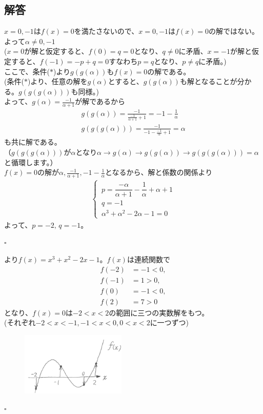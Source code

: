 \subsection*{解答}
\noindent [1]\quad $x = 0,-1$は$f(x)=0$を満たさないので、$x = 0,-1$は$f(x)=0$の解ではない。
よって$\alpha \neq 0,-1$\\
($x = 0$が解と仮定すると、$f(0) = q = 0$となり、$q \neq 0$に矛盾、$x = -1$が解と仮定すると、$f(-1) = -p + q = 0$すなわち$p=q$となり、$p \neq q$に矛盾。)\\
ここで、条件($\ast$)より$g(g(\alpha))$も$f(x) = 0$の解である。\\
(条件($\ast$)より、任意の解を$g(\alpha)$とすると、$g(g(\alpha))$も解となることが分かる。$g(g(g(\alpha)))$も同様。)\\
よって、$g(\alpha) = \frac{-1}{\alpha + 1}$が解であるから
\begin{align*}
 g(g(\alpha)) = \frac{-1}{\frac{-1}{\alpha + 1}+1} = - 1 - \frac{1}{\alpha}\\
 g(g(g(\alpha))) = \frac{-1}{-1-\frac{-1}{\alpha}+1} = \alpha
\end{align*}
も共に解である。\\
（$g(g(g(\alpha)))$が$\alpha$となり$\alpha \rightarrow g(\alpha) \rightarrow g(g(\alpha)) \rightarrow g(g(g(\alpha))) = \alpha$と循環します。）\\
$f(x) = 0$の解が$\alpha,\frac{-1}{\alpha + 1},-1-\frac{1}{\alpha}$となるから、解と係数の関係より
\begin{align*}
  \begin{cases}
  \, p = \dfrac{-\alpha}{\alpha + 1}-\dfrac{1}{\alpha}+\alpha +1\\
  \, q = -1\\
  \, \alpha^3 + \alpha^2 -2\alpha -1 = 0
  \end{cases}
\end{align*}
よって、$p = -2,\,q=-1$。
\begin{flushright}
  $\square$
\end{flushright}

\noindent [2]\quad {[1]}より$f(x) = x^3 + x^2 -2x -1$。$f(x)$は連続関数で
\begin{align*}
  f(-2) &= -1 < 0,\\
  f(-1) &= 1 > 0,\\
  f(0) &= -1 < 0,\\
  f(2) &= 7 > 0
\end{align*}
となり、$f(x) = 0$は$-2<x<2$の範囲に三つの実数解をもつ。\\
(それぞれ$-2<x<-1,-1<x<0,0<x<2$に一つずつ)
\begin{figure}[H]
  \centering
  \includegraphics[width=5cm]{tuzi/image/0}
\end{figure}
\begin{flushright}
  $\square$
\end{flushright}


